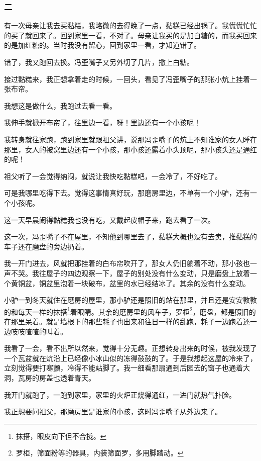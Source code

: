 \subsubsection*{二}
\par 有一次母亲让我去买黏糕，我略微的去得晚了一点，黏糕已经出锅了。我慌慌忙忙的买了就回来了。回到家里一看，不对了。母亲让我买的是加白糖的，而我买回来的是加红糖的。当时我没有留心，回到家里一看，才知道错了。
\par 错了，我又跑回去换。冯歪嘴子又另外切了几片，撒上白糖。
\par 接过黏糕来，我正想拿着走的时候，一回头，看见了冯歪嘴子的那张小炕上挂着一张布帘。
\par 我想这是做什么，我跑过去看一看。
\par 我伸手就掀开布帘了，往里边一看，呀！里边还有一个小孩呢！
\par 我转身就往家跑，跑到家里就跟祖父讲，说那冯歪嘴子的炕上不知谁家的女人睡在那里，女人的被窝里边还有一个小孩，那小孩还露着小头顶呢，那小孩头还是通红的呢！
\par 祖父听了一会觉得纳闷，就说让我快吃黏糕吧，一会冷了，不好吃了。
\par 可是我哪里吃得下去。觉得这事情真好玩，那磨房里边，不单有一个小驴，还有一个小孩呢。
\par 这一天早晨闹得黏糕我也没有吃，又戴起皮帽子来，跑去看了一次。
\par 这一次，冯歪嘴子不在屋里，不知他到哪里去了，黏糕大概也没有去卖，推黏糕的车子还在磨盘的旁边扔着。
\par 我一开门进去，风就把那挂着的白布帘吹开了，那女人仍旧躺着不动，那小孩也一声不哭。我往屋子的四边观察一下，屋子的别处没有什么变动，只是磨盘上放着一个黄铜盆，铜盆里泡着一块破布，盆里的水已经结冰了。其余的没有什么变动。
\par 小驴一到冬天就住在磨房的屋里，那小驴还是照旧的站在那里，并且还是安安敦敦的和每天一样的抹搭\footnote{抹搭，眼皮向下但不合拢。}着眼睛。其余的磨房里的风车子，罗柜\footnote{罗柜，筛面粉等的器具，内装筛面罗，多用脚踏动。}，磨盘，都是照旧的在那里呆着。就是墙根下的那些耗子也出来和往日一样的乱跑，耗子一边跑着还一边吱吱喳喳的叫着。
\par 我看了一会，看不出所以然来，觉得十分无趣。正想转身出来的时候，被我发现了一个瓦盆就在炕沿上已经像小冰山似的冻得鼓鼓的了。于是我想起这屋的冷来了，立刻觉得要打寒颤，冷得不能站脚了。我一细看那扇通到后园去的窗子也通着大洞，瓦房的房盖也透着青天。
\par 我开门就跑了，一跑到家里，家里的火炉正烧得通红，一进门就热气扑脸。
\par 我正想要问祖父，那磨房里是谁家的小孩，这时冯歪嘴子从外边来了。
